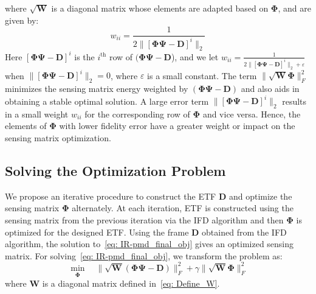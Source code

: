 %
where $\sqrt{\bm{W}}$ is a diagonal matrix whose elements are adapted based on $\bm{\Phi}$, and are given by:
%
\begin{equation}
    \label{eq: Define_W}
    w_{ii} = \frac{1}{2\|\left[\bm{\Phi}\bm{\Psi}-\bm{D}\right]^{i}\|_{2}}
\end{equation}
%
Here $\left[\bm{\Phi}\bm{\Psi}-\bm{D}\right]^{i}$ is the $i^{\text{th}}$ row of $(\bm{\Phi}\bm{\Psi}-\bm{D}$), and we let $w_{ii} = \frac{1}{2 \| \left[\bm{\Phi} \bm{\Psi} - \bm{D} \right]^{i} \|_{2} + \varepsilon }$ when $\| \left[\bm{\Phi}\bm{\Psi}-\bm{D}\right]^{i}\|_{2} = 0$, where $\varepsilon$ is a small constant. The term $\|\sqrt{\bm{W}}\bm{\Phi}\|_{F}^{2}$ minimizes the sensing matrix energy weighted by $\left(\bm{\Phi}\bm{\Psi}-\bm{D}\right)$ and also aids in obtaining a stable optimal solution. A large error term $\|\left[\bm{\Phi}\bm{\Psi}-\bm{D}\right]^{i}\|_{2}$ results in a small weight $w_{ii}$ for the corresponding row of $\bm{\Phi}$ and vice versa. Hence, the elements of $\bm{\Phi}$ with lower fidelity error have a greater weight or impact on the sensing matrix optimization.
\subsection{Solving the Optimization Problem}
We propose an iterative procedure to construct the ETF $\bm{D}$ and optimize the sensing matrix $\bm{\Phi}$ alternately. At each iteration, ETF is constructed using the sensing matrix from the previous iteration via the IFD algorithm and then $\bm{\Phi}$ is optimized for the designed ETF. Using the frame $\bm{D}$ obtained from the IFD algorithm, the solution to~\eqref{eq: IR-pmd_final_obj} gives an optimized sensing matrix. For solving~\eqref{eq: IR-pmd_final_obj}, we transform the problem as:
\begin{equation}
    \label{eq: IR_pmd_easy}
  \underset{\bm{\Phi}}{\min}\quad \| \sqrt{\bm{W}} (\bm{\Phi}\bm{\Psi} - \bm{D}) \|_{F}^{2} + \gamma \| \sqrt{\bm{W}} \bm{\Phi} \|_{F}^{2}
\end{equation}
%
where $\bm{W}$ is a diagonal matrix defined in~\eqref{eq: Define_W}. 

